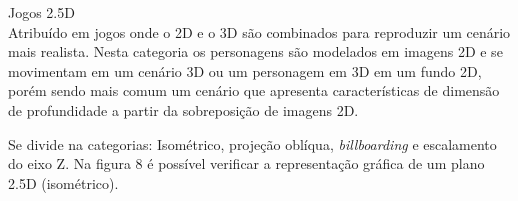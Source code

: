 \begin{alineascomponto}


\item Jogos 2.5D\\
Atribuído em jogos onde o 2D e o 3D são combinados para reproduzir um cenário mais realista. Nesta categoria os personagens são modelados em imagens 2D e se movimentam em um cenário 3D ou um personagem em 3D em um fundo 2D, porém sendo mais comum um cenário que apresenta características de dimensão de profundidade a partir da sobreposição de imagens 2D.

Se divide na categorias: Isométrico, projeção oblíqua, \textit{billboarding} e escalamento do eixo Z. Na figura 8 é possível verificar a representação gráfica de um plano 2.5D (isométrico). \cite{graf}

\end{alineascomponto}

\begin{figure}[h!]
		\centering
	\end{figure}
	
